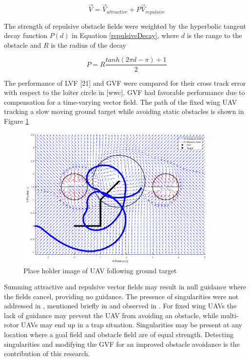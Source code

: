 \documentclass[numbered,pdftex]{ohio-etd}
\begin{document}
 
 \begin{equation}
 \overrightarrow{V} = \overrightarrow{V}_{attractive}+P\overrightarrow{V}_{repulsive}
 \label{summedAttRepulsive}
 \end{equation}
 
 \noindent
 The strength of repulsive obstacle fields were weighted by the hyperbolic tangent decay function $P(d)$ in Equation \ref{repulsiveDecay}, where $d$ is the range to the obstacle and $R$ is the radius of the decay
 
 \begin{equation}
 P = R\frac{tanh(2\pi d-\pi)+1}{2}
 \label{repulsiveDecay}
 \end{equation}
 
 \noindent
 The performance of LVF [21] and GVF \cite{goncalves_artificial_2009,goncalves_circulation_2010,goncalves_vector_2010} were compared for their cross track error with respect to the loiter circle in [wwc]. GVF had favorable performance due to compensation for a time-varying vector field. The path of the fixed wing UAV tracking a slow moving ground target while avoiding static obstacles is shown in Figure \ref{fig:gvfMovingTarget}


\begin{figure}[H]
	\centering
	\includegraphics[width=10cm]{PaperFigures/gvfMovingTarget}
	\caption{Place holder image of UAV following ground target \cite{wwc}}
	\label{fig:gvfMovingTarget}
\end{figure}

Summing attractive and repulsive vector fields may result in null guidance where the fields cancel, providing no guidance. The presence of singularities were not addressed in \cite{wwc}, mentioned briefly in \cite{nelson_cooperative_2005} and observed in \cite{panagou_motion_2014}. For fixed wing UAVs the lack of guidance may prevent the UAV from avoiding an obstacle, while multi-rotor UAVs may end up in a trap situation. Singularities may be present at any location where a goal field and obstacle field are of equal strength. Detecting singularities and modifying the GVF for an improved obstacle avoidance is the contribution of this research.
\end{document}
